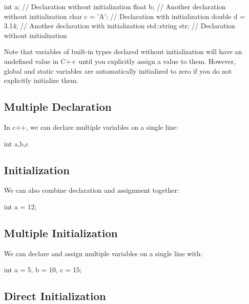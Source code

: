 \documentclass{report}
\begin{document}
    \begin{cppcode}
int a;              // Declaration without initialization
float b;            // Another declaration without initialization
char c = 'A';       // Declaration with initialization
double d = 3.14;    // Another declaration with initialization
std::string str;    // Declaration without initialization
    \end{cppcode}
    
    \bigbreak \noindent 
    Note that variables of built-in types declared without initialization will have an undefined value in C++ until you explicitly assign a value to them. However, global and static variables are automatically initialized to zero if you do not explicitly initialize them.

    \bigbreak \noindent 
    \subsection{Multiple Declaration}
    \bigbreak \noindent 
    In c++, we can declare multiple variables on a single line:
    \bigbreak \noindent 
    
    \begin{cppcode}
int a,b,c
    \end{cppcode}
    

    \bigbreak \noindent 
    \subsection{Initialization}
    \bigbreak \noindent 
    We can also combine declaration and assignment together:
    \bigbreak \noindent 
    
    \begin{cppcode}
int a = 12;
    \end{cppcode}
    

    \bigbreak \noindent 
    \subsection{Multiple Initialization}
    \bigbreak \noindent 
    We can declare and assign multiple variables on a single line with:
    \bigbreak \noindent 
    
    \begin{cppcode}
int a = 5, b = 10, c = 15;
    \end{cppcode}
    

    \bigbreak \noindent 
    \subsection{Direct Initialization}
    \bigbreak \noindent 
    
\end{document}
